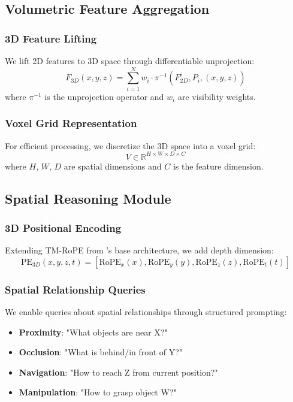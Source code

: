 \subsection{Volumetric Feature Aggregation}

\subsubsection{3D Feature Lifting}
We lift 2D features to 3D space through differentiable unprojection:
\begin{equation}
F_{3D}(x, y, z) = \sum_{i=1}^N w_i \cdot \pi^{-1}(F_{2D}^i, P_i, (x, y, z))
\end{equation}
where $\pi^{-1}$ is the unprojection operator and $w_i$ are visibility weights.

\subsubsection{Voxel Grid Representation}
For efficient processing, we discretize the 3D space into a voxel grid:
\begin{equation}
V \in \mathbb{R}^{H \times W \times D \times C}
\end{equation}
where $H$, $W$, $D$ are spatial dimensions and $C$ is the feature dimension.

\subsection{Spatial Reasoning Module}

\subsubsection{3D Positional Encoding}
Extending TM-RoPE from \zen{}'s base architecture, we add depth dimension:
\begin{equation}
\text{PE}_{3D}(x, y, z, t) = [\text{RoPE}_x(x), \text{RoPE}_y(y), \text{RoPE}_z(z), \text{RoPE}_t(t)]
\end{equation}

\subsubsection{Spatial Relationship Queries}
We enable queries about spatial relationships through structured prompting:
\begin{itemize}
    \item \textbf{Proximity}: "What objects are near X?"
    \item \textbf{Occlusion}: "What is behind/in front of Y?"
    \item \textbf{Navigation}: "How to reach Z from current position?"
    \item \textbf{Manipulation}: "How to grasp object W?"
\end{itemize}

